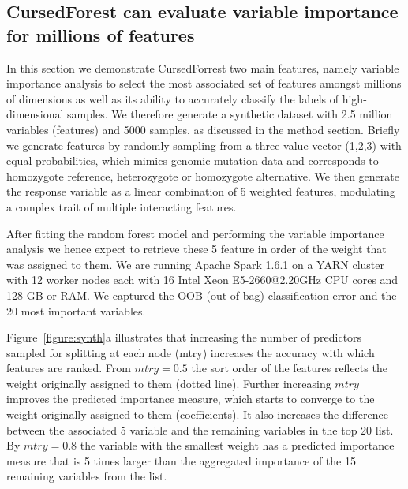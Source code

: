 \documentclass[10pt,a4paper]{article}  %
\newcommand{\cursedforest}{{\sc CursedForest}}
\begin{document}
\subsection{CursedForest can evaluate variable importance for millions of features  }\label{synthetic}
In this section we demonstrate CursedForrest two main features, namely variable importance analysis to select the most associated set of features amongst millions of dimensions as well as its ability to accurately classify the labels of high-dimensional samples. 
We therefore generate a synthetic dataset with 2.5 million variables (features) and 5000 samples, as discussed in the method section. 
Briefly we generate features by randomly sampling from a three value vector (1,2,3) with equal probabilities, which mimics genomic mutation data and corresponds to homozygote reference, heterozygote or homozygote alternative. 
We then generate the response variable as a linear combination of 5 weighted features, modulating a complex trait of multiple interacting features. 

After fitting the random forest model and performing the variable importance analysis we hence expect to retrieve these 5 feature in order of the weight that was assigned to them. 
We are running Apache Spark 1.6.1 on a YARN cluster with 12 worker nodes each with 16 Intel Xeon E5-2660@2.20GHz CPU cores and 128 GB or RAM. 
We captured the OOB (out of bag) classification error and the 20 most important variables.

Figure~\ref{figure:synth}a illustrates that increasing the number of predictors sampled for splitting at each node (mtry) increases the accuracy with which features are ranked. 
From $mtry=0.5$ the sort order of the features reflects the weight originally assigned to them (dotted line). Further increasing $mtry$ improves the predicted importance measure, which starts to converge to the weight originally assigned to them (coefficients). 
It also increases the difference between the associated 5 variable and the remaining variables in the top 20 list. 
By $mtry=0.8$ the variable with the smallest weight has a predicted importance measure that is 5 times larger than the aggregated importance of the 15 remaining variables from the list.  
\end{document}
